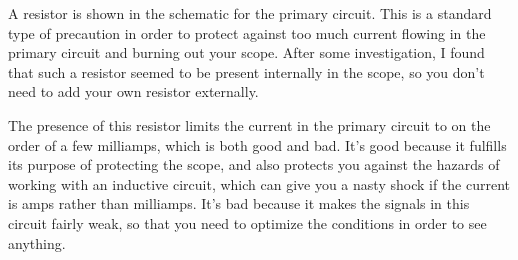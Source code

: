 A resistor is shown in the schematic for the primary circuit.  This is
a standard type of precaution in order to protect against too much
current flowing in the primary circuit and burning out your scope.
After some investigation, I found that such a resistor seemed to be
present internally in the scope, so you don't need to add your own
resistor externally.

The presence of this resistor limits the current in
the primary circuit to on the order of a few milliamps, which is both good
and bad. It's good because it fulfills its purpose of protecting the scope,
and also protects you against the hazards of working with an inductive
circuit, which can give you a nasty shock if the current is amps rather
than milliamps. It's bad because it makes the signals in this circuit fairly
weak, so that you need to optimize the conditions in order to see anything.

